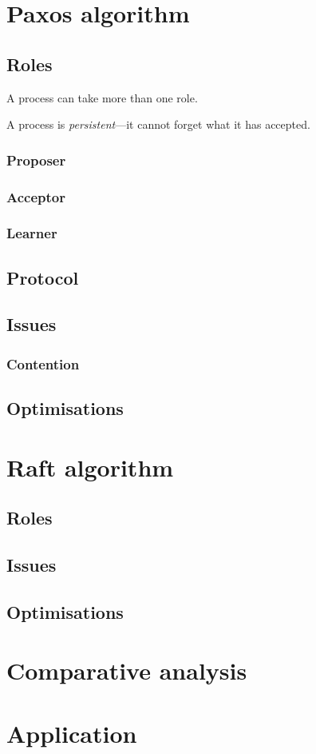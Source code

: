 \documentclass[12pt, a4paper]{article}
\begin{document}
\section{Paxos algorithm}

\subsection{Roles}

A process can take more than one role.

A process is \textit{persistent}---it cannot forget what it has accepted.

  \subsubsection{Proposer}

  \subsubsection{Acceptor}

  \subsubsection{Learner}

\subsection{Protocol}

\subsection{Issues}

  \subsubsection{Contention}

\subsection{Optimisations}


\section{Raft algorithm}

\subsection{Roles}

\subsection{Issues}

\subsection{Optimisations}


\section{Comparative analysis}


\section{Application}




\end{document}
